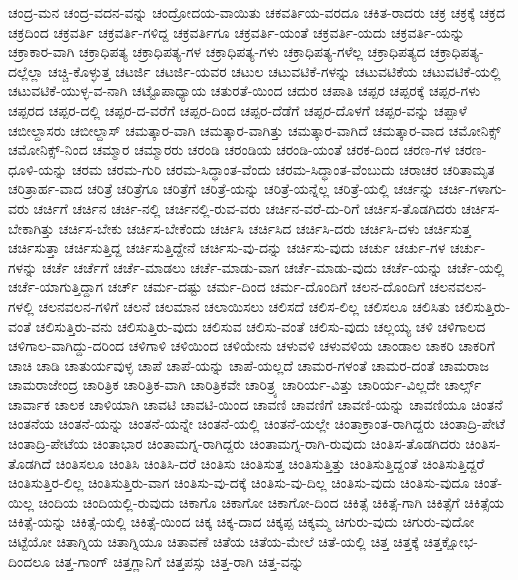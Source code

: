 {ಚಂದ್ರ-ಮನ
ಚಂದ್ರ-ವದನ-ವನ್ನು
ಚಂದ್ರೋದಯ-ವಾಯಿತು
ಚಕವರ್ತಿಯ-ವರದೂ
ಚಕಿತ-ರಾದರು
ಚಕ್ರ
ಚಕ್ರಕ್ಕೆ
ಚಕ್ರದ
ಚಕ್ರದಿಂದ
ಚಕ್ರವರ್ತಿ
ಚಕ್ರವರ್ತಿ-ಗಳಿದ್ದ
ಚಕ್ರವರ್ತಿಗೂ
ಚಕ್ರವರ್ತಿ-ಯಂತೆ
ಚಕ್ರವರ್ತಿ-ಯದು
ಚಕ್ರವರ್ತಿ-ಯನ್ನು
ಚಕ್ರಾಕಾರ-ವಾಗಿ
ಚಕ್ರಾಧಿಪತ್ಯ
ಚಕ್ರಾಧಿಪತ್ಯ-ಗಳ
ಚಕ್ರಾಧಿಪತ್ಯ-ಗಳು
ಚಕ್ರಾಧಿಪತ್ಯ-ಗಳೆಲ್ಲ
ಚಕ್ರಾಧಿಪತ್ಯದ
ಚಕ್ರಾಧಿಪತ್ಯ-ದಲ್ಲೆಲ್ಲಾ
ಚಚ್ಚಿ-ಕೊಳ್ಳುತ್ತ
ಚಟರ್ಜಿ
ಚಟರ್ಜಿ-ಯವರ
ಚಟುಲ
ಚಟುವಟಿಕೆ-ಗಳನ್ನು
ಚಟುವಟಿಕೆಯ
ಚಟುವಟಿಕೆ-ಯಲ್ಲಿ
ಚಟುವಟಿಕೆ-ಯುಳ್ಳ-ವ-ನಾಗಿ
ಚಟ್ಟೊಪಾಧ್ಯಾಯ
ಚತುರತೆ-ಯಿಂದ
ಚದುರ
ಚಪಾತಿ
ಚಪ್ಪರ
ಚಪ್ಪರಕ್ಕೆ
ಚಪ್ಪರ-ಗಳು
ಚಪ್ಪರದ
ಚಪ್ಪರ-ದಲ್ಲಿ
ಚಪ್ಪರ-ದ-ವರೆಗೆ
ಚಪ್ಪರ-ದಿಂದ
ಚಪ್ಪರ-ದೆಡೆಗೆ
ಚಪ್ಪರ-ದೊಳಗೆ
ಚಪ್ಪರ-ವನ್ನು
ಚಪ್ಪಾಳೆ
ಚಬೀಲ್ದಾಸರು
ಚಬೀಲ್ದಾಸ್
ಚಮತ್ಕಾರ-ವಾಗಿ
ಚಮತ್ಕಾರ-ವಾಗಿತ್ತು
ಚಮತ್ಕಾರ-ವಾಗಿದೆ
ಚಮತ್ಕಾರ-ವಾದ
ಚಮೋನಿಕ್ಸ್
ಚಮೋನಿಕ್ಸ್-ನಿಂದ
ಚಮ್ಮಾರ
ಚಮ್ಮಾರರು
ಚರಂಡಿ
ಚರಂಡಿಯ
ಚರಂಡಿ-ಯಂತೆ
ಚರಕ-ದಿಂದ
ಚರಣ-ಗಳ
ಚರಣ-ಧೂಳಿ-ಯನ್ನು
ಚರಮ
ಚರಮ-ಗುರಿ
ಚರಮ-ಸಿದ್ಧಾಂತ-ವೆಂದು
ಚರಮ-ಸಿದ್ಧಾಂತ-ವೆಂಬುದು
ಚರಾಚರ
ಚರಿತಾಮೃತ
ಚರಿತ್ರಾರ್ಹ-ವಾದ
ಚರಿತ್ರೆ
ಚರಿತ್ರೆಗೂ
ಚರಿತ್ರೆಗೆ
ಚರಿತ್ರೆ-ಯನ್ನು
ಚರಿತ್ರೆ-ಯನ್ನೆಲ್ಲ
ಚರಿತ್ರೆ-ಯಲ್ಲಿ
ಚರ್ಚನ್ನು
ಚರ್ಚಿ-ಗಳಾಗು-ವರು
ಚರ್ಚಿಗೆ
ಚರ್ಚಿನ
ಚರ್ಚಿ-ನಲ್ಲಿ
ಚರ್ಚಿನಲ್ಲಿ-ರುವ-ವರು
ಚರ್ಚಿನ-ವರೆ-ದು-ರಿಗೆ
ಚರ್ಚಿಸ-ತೊಡಗಿದರು
ಚರ್ಚಿಸ-ಬೇಕಾಗಿತ್ತು
ಚರ್ಚಿಸ-ಬೇಕು
ಚರ್ಚಿಸ-ಬೇಕೆಂದು
ಚರ್ಚಿಸಿ
ಚರ್ಚಿಸಿದ
ಚರ್ಚಿಸಿ-ದರು
ಚರ್ಚಿಸಿ-ದಳು
ಚರ್ಚಿಸುತ್ತ
ಚರ್ಚಿಸುತ್ತಾ
ಚರ್ಚಿಸುತ್ತಿದ್ದ
ಚರ್ಚಿಸುತ್ತಿದ್ದೇನೆ
ಚರ್ಚಿಸು-ವು-ದನ್ನು
ಚರ್ಚಿಸು-ವುದು
ಚರ್ಚು
ಚರ್ಚು-ಗಳ
ಚರ್ಚು-ಗಳನ್ನು
ಚರ್ಚೆ
ಚರ್ಚೆಗೆ
ಚರ್ಚೆ-ಮಾಡಲು
ಚರ್ಚೆ-ಮಾಡು-ವಾಗ
ಚರ್ಚೆ-ಮಾಡು-ವುದು
ಚರ್ಚೆ-ಯನ್ನು
ಚರ್ಚೆ-ಯಲ್ಲಿ
ಚರ್ಚೆ-ಯಾಗುತ್ತಿದ್ದಾಗ
ಚರ್ಚ್
ಚರ್ಮ-ದಷ್ಟು
ಚರ್ಮ-ದಿಂದ
ಚರ್ಮ-ದೊಂದಿಗೆ
ಚಲನ-ದೊಂದಿಗೆ
ಚಲನವಲನ-ಗಳಲ್ಲಿ
ಚಲನವಲನ-ಗಳಿಗೆ
ಚಲನೆ
ಚಲಮಾನ
ಚಲಾಯಿಸಲು
ಚಲಿಸದೆ
ಚಲಿಸ-ಲಿಲ್ಲ
ಚಲಿಸಲೂ
ಚಲಿಸಿತು
ಚಲಿಸುತ್ತಿರು-ವಂತೆ
ಚಲಿಸುತ್ತಿರು-ವನು
ಚಲಿಸುತ್ತಿರು-ವುದು
ಚಲಿಸುವ
ಚಲಿಸು-ವಂತೆ
ಚಲಿಸು-ವುದು
ಚಲ್ಲಯ್ಯ
ಚಳಿ
ಚಳಿಗಾಲದ
ಚಳಿಗಾಲ-ವಾಗಿದ್ದು-ದರಿಂದ
ಚಳಿಗಾಳಿ
ಚಳಿಯಿಂದ
ಚಳಿಯೇನು
ಚಳುವಳಿ
ಚಳುವಳಿಯ
ಚಾಂಡಾಲ
ಚಾಕರಿ
ಚಾಕರಿಗೆ
ಚಾಚಿ
ಚಾಡಿ
ಚಾತುರ್ಯವುಳ್ಳ
ಚಾಪೆ
ಚಾಪೆ-ಯನ್ನು
ಚಾಪೆ-ಯಲ್ಲದೆ
ಚಾಮರ-ಗಳಂತೆ
ಚಾಮರ-ದಂತೆ
ಚಾಮರಾಜ
ಚಾಮರಾಜೇಂದ್ರ
ಚಾರಿತ್ರಿಕ
ಚಾರಿತ್ರಿಕ-ವಾಗಿ
ಚಾರಿತ್ರಿಕವೇ
ಚಾರಿತ್ರ್ಯ
ಚಾರಿರ್ಯ-ವಿತ್ತು
ಚಾರಿರ್ಯ-ವಿಲ್ಲದೇ
ಚಾರ್ಲ್ಸ್
ಚಾರ್ವಾಕ
ಚಾಲಕ
ಚಾಳಿಯಾಗಿ
ಚಾವಟಿ
ಚಾವಟಿ-ಯಿಂದ
ಚಾವಣಿ
ಚಾವಣಿಗೆ
ಚಾವಣಿ-ಯನ್ನು
ಚಾವಣಿಯೂ
ಚಿಂತನೆ
ಚಿಂತನೆಯ
ಚಿಂತನೆ-ಯನ್ನು
ಚಿಂತನೆ-ಯನ್ನೇ
ಚಿಂತನೆ-ಯಲ್ಲಿ
ಚಿಂತನೆ-ಯಲ್ಲೇ
ಚಿಂತಾಕ್ರಾಂತ-ರಾಗಿದ್ದರು
ಚಿಂತಾದ್ರಿ-ಪೇಟೆ
ಚಿಂತಾದ್ರಿ-ಪೇಟೆಯ
ಚಿಂತಾಭಾರ
ಚಿಂತಾಮಗ್ನ-ರಾಗಿದ್ದರು
ಚಿಂತಾಮಗ್ನ-ರಾಗಿ-ರುವುದು
ಚಿಂತಿಸ-ತೊಡಗಿದರು
ಚಿಂತಿಸ-ತೊಡಗಿದೆ
ಚಿಂತಿಸಲೂ
ಚಿಂತಿಸಿ
ಚಿಂತಿಸಿ-ದರೆ
ಚಿಂತಿಸು
ಚಿಂತಿಸುತ್ತ
ಚಿಂತಿಸುತ್ತಿತ್ತು
ಚಿಂತಿಸುತ್ತಿದ್ದಂತೆ
ಚಿಂತಿಸುತ್ತಿದ್ದರೆ
ಚಿಂತಿಸುತ್ತಿರ-ಲಿಲ್ಲ
ಚಿಂತಿಸುತ್ತಿರು-ವಾಗ
ಚಿಂತಿಸು-ವು-ದಕ್ಕೆ
ಚಿಂತಿಸು-ವು-ದಿಲ್ಲ
ಚಿಂತಿಸು-ವುದು
ಚಿಂತಿಸು-ವುದೂ
ಚಿಂತೆ-ಯಿಲ್ಲ
ಚಿಂದಿಯ
ಚಿಂದಿಯಲ್ಲಿ-ರುವುದು
ಚಿಕಾಗೊ
ಚಿಕಾಗೋ
ಚಿಕಾಗೋ-ದಿಂದ
ಚಿಕಿತ್ಸೆ
ಚಿಕಿತ್ಸೆ-ಗಾಗಿ
ಚಿಕಿತ್ಸೆಗೆ
ಚಿಕಿತ್ಸೆಯ
ಚಿಕಿತ್ಸೆ-ಯನ್ನು
ಚಿಕಿತ್ಸೆ-ಯಲ್ಲಿ
ಚಿಕಿತ್ಸೆ-ಯಿಂದ
ಚಿಕ್ಕ
ಚಿಕ್ಕ-ದಾದ
ಚಿಕ್ಕಪ್ಪ
ಚಿಕ್ಕಮ್ಮ
ಚಿಗುರು-ವುದು
ಚಿಗುರು-ವುದೋ
ಚಿಟ್ಟೆಯೋ
ಚಿತಾಗ್ನಿಯ
ಚಿತಾಗ್ನಿಯೂ
ಚಿತಾವಣೆ
ಚಿತೆಯ
ಚಿತೆಯ-ಮೇಲೆ
ಚಿತೆ-ಯಲ್ಲಿ
ಚಿತ್ತ
ಚಿತ್ತಕ್ಕೆ
ಚಿತ್ತಕ್ಷೋಭ-ದಿಂದಲೂ
ಚಿತ್ತ-ಗಾಂಗ್
ಚಿತ್ತಗ್ಲಾನಿಗೆ
ಚಿತ್ತಪಸ್ಸು
ಚಿತ್ತ-ರಾಗಿ
ಚಿತ್ತ-ವನ್ನು
}
